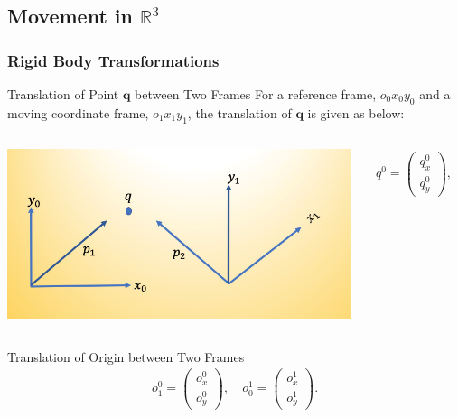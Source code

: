 \subsection{Movement in $\mathbb{R}^3$}
\begin{frame}
	\frametitle{Rigid Body Transformations}
	\begin{block}{Translation of Point $\bm{q}$ between Two Frames}
		For a reference frame, $o_0 x_0 y_0$ and a moving coordinate frame, $o_1 x_1 y_1$, the translation of $\bm{q}$ is given as below:
	\end{block}
	\begin{columns}[]
		\begin{column}{.5\linewidth}
			\centering
			\includegraphics[width=\textwidth]{../Notes/figures/trans_coords.jpg}
		\end{column}
		\begin{column}{.5\linewidth}
			\begin{align}
				q^0 = \left( \begin{array}{c}
					q^0_x \\ q_y^0
				\end{array}
				\right), \quad
				q^1 = \left( \begin{array}{c}
					q^1_x \\ q_y^1
				\end{array}
				\right) \nonumber
			\end{align}
		\end{column}
	\end{columns}
	\begin{block}{Translation of Origin between Two Frames}
		\begin{align}
			o^0_1 = \left( \begin{array}{c}
				o^0_x \\ o^0_y
			\end{array}
			\right), \quad
			o^1_0 = \left( \begin{array}{c}
				o^1_x \\ o^1_y
			\end{array}
			\right).
		\end{align}
	\end{block}
\end{frame}


